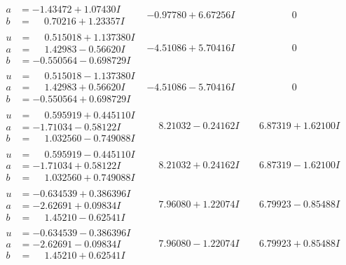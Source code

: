 \documentclass[1p]{elsarticle_modified}
\theoremstyle{definition}
\begin{document}
$$\begin{array}{c|c|c}
\begin{aligned}
a &= -1.43472 + 1.07430 I \\
b &= \phantom{-}0.70216 + 1.23357 I\end{aligned}
 & -0.97780 + 6.67256 I & \phantom{-0.000000 } 0 \\ \hline\begin{aligned}
u &= \phantom{-}0.515018 + 1.137380 I \\
a &= \phantom{-}1.42983 - 0.56620 I \\
b &= -0.550564 - 0.698729 I\end{aligned}
 & -4.51086 + 5.70416 I & \phantom{-0.000000 } 0 \\ \hline\begin{aligned}
u &= \phantom{-}0.515018 - 1.137380 I \\
a &= \phantom{-}1.42983 + 0.56620 I \\
b &= -0.550564 + 0.698729 I\end{aligned}
 & -4.51086 - 5.70416 I & \phantom{-0.000000 } 0 \\ \hline\begin{aligned}
u &= \phantom{-}0.595919 + 0.445110 I \\
a &= -1.71034 - 0.58122 I \\
b &= \phantom{-}1.032560 - 0.749088 I\end{aligned}
 & \phantom{-}8.21032 - 0.24162 I & \phantom{-}6.87319 + 1.62100 I \\ \hline\begin{aligned}
u &= \phantom{-}0.595919 - 0.445110 I \\
a &= -1.71034 + 0.58122 I \\
b &= \phantom{-}1.032560 + 0.749088 I\end{aligned}
 & \phantom{-}8.21032 + 0.24162 I & \phantom{-}6.87319 - 1.62100 I \\ \hline\begin{aligned}
u &= -0.634539 + 0.386396 I \\
a &= -2.62691 + 0.09834 I \\
b &= \phantom{-}1.45210 - 0.62541 I\end{aligned}
 & \phantom{-}7.96080 + 1.22074 I & \phantom{-}6.79923 - 0.85488 I \\ \hline\begin{aligned}
u &= -0.634539 - 0.386396 I \\
a &= -2.62691 - 0.09834 I \\
b &= \phantom{-}1.45210 + 0.62541 I\end{aligned}
 & \phantom{-}7.96080 - 1.22074 I & \phantom{-}6.79923 + 0.85488 I\\

\end{array}$$
\end{document}
